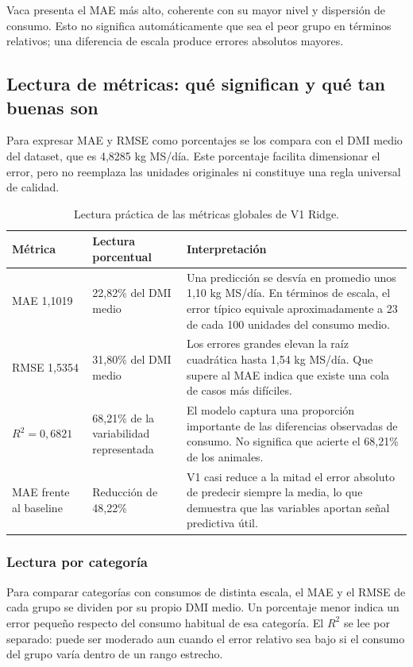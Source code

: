 \documentclass[11pt,a4paper]{article}
\begin{document}
Vaca presenta el MAE más alto, coherente con su mayor nivel y dispersión de consumo. Esto no significa automáticamente que sea el peor grupo en términos relativos; una diferencia de escala produce errores absolutos mayores.

\subsection{Lectura de métricas: qué significan y qué tan buenas son}

Para expresar MAE y RMSE como porcentajes se los compara con el DMI medio del dataset, que es 4,8285 kg MS/día. Este porcentaje facilita dimensionar el error, pero no reemplaza las unidades originales ni constituye una regla universal de calidad.

\begin{table}[H]
\centering
\caption{Lectura práctica de las métricas globales de V1 Ridge.}
\begin{tabularx}{\textwidth}{p{2.5cm}p{2.8cm}X}
\toprule
\textbf{Métrica} & \textbf{Lectura porcentual} & \textbf{Interpretación}\\
\midrule
MAE 1,1019 & 22,82\% del DMI medio & Una predicción se desvía en promedio unos 1,10 kg MS/día. En términos de escala, el error típico equivale aproximadamente a 23 de cada 100 unidades del consumo medio.\\
RMSE 1,5354 & 31,80\% del DMI medio & Los errores grandes elevan la raíz cuadrática hasta 1,54 kg MS/día. Que supere al MAE indica que existe una cola de casos más difíciles.\\
$R^2=0,6821$ & 68,21\% de la variabilidad representada & El modelo captura una proporción importante de las diferencias observadas de consumo. No significa que acierte el 68,21\% de los animales.\\
MAE frente al baseline & Reducción de 48,22\% & V1 casi reduce a la mitad el error absoluto de predecir siempre la media, lo que demuestra que las variables aportan señal predictiva útil.\\
\bottomrule
\end{tabularx}
\end{table}

\subsubsection{Lectura por categoría}

Para comparar categorías con consumos de distinta escala, el MAE y el RMSE de cada grupo se dividen por su propio DMI medio. Un porcentaje menor indica un error pequeño respecto del consumo habitual de esa categoría. El $R^2$ se lee por separado: puede ser moderado aun cuando el error relativo sea bajo si el consumo del grupo varía dentro de un rango estrecho.
\end{document}
